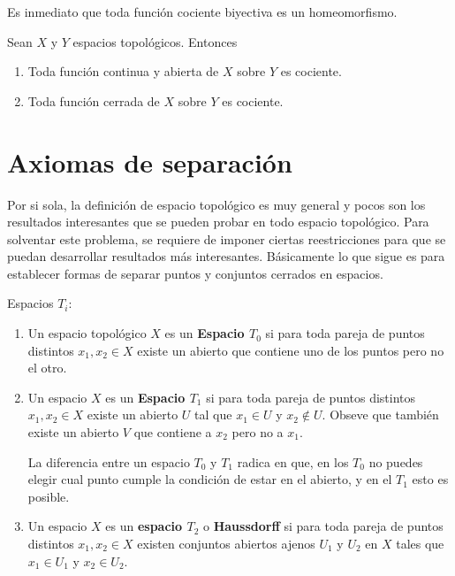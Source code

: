 \documentclass[12pt]{report}
\theoremstyle{largebreak}
\begin{document}
    \begin{obs}
        Es inmediato que toda función cociente biyectiva es un homeomorfismo.
    \end{obs}

    \begin{propo}
        Sean $X$ y $Y$ espacios topológicos. Entonces
        \begin{enumerate}
            \item Toda función continua y abierta de $X$ sobre $Y$ es cociente.
            \item Toda función cerrada de $X$ sobre $Y$ es cociente.
        \end{enumerate}
    \end{propo}

    \section{Axiomas de separación}

    Por si sola, la definición de espacio topológico es muy general y pocos son los resultados interesantes que se pueden probar en todo espacio topológico. Para solventar este problema, se requiere de imponer ciertas reestricciones para que se puedan desarrollar resultados más interesantes. Básicamente lo que sigue es para establecer formas de separar puntos y conjuntos cerrados en espacios. 

    \begin{mydef}
        Espacios $T_i$:
        \begin{enumerate}
            \item Un espacio topológico $X$ es un \textbf{Espacio $T_0$} si para toda pareja de puntos distintos $x_1,x_2\in X$ existe un abierto que contiene uno de los puntos pero no el otro.
            \item Un espacio $X$ es un \textbf{Espacio $T_1$} si para toda pareja de puntos distintos $x_1,x_2\in X$ existe un abierto $U$ tal que $x_1\in U$ y $x_2\notin U$. Obseve que también existe un abierto $V$ que contiene a $x_2$ pero no a $x_1$.
            
            La diferencia entre un espacio $T_0$ y $T_1$ radica en que, en los $T_0$ no puedes elegir cual punto cumple la condición de estar en el abierto, y en el $T_1$ esto es posible.
            \item Un espacio $X$ es un \textbf{espacio $T_2$} o \textbf{Haussdorff} si para toda pareja de puntos distintos $x_1,x_2\in X$ existen conjuntos abiertos ajenos $U_1$ y $U_2$ en $X$ tales que $x_1\in U_1$ y $x_2\in U_2$.
        \end{enumerate}
    \end{mydef}
\end{document}
